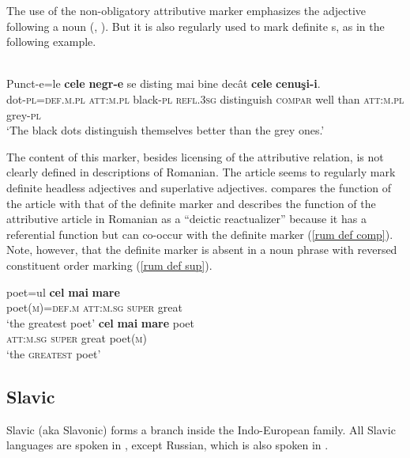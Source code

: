The use of the non-obligatory attributive marker emphasizes the adjective following a noun (\citealt[94]{beyer-etal1987}, \citealt[148]{posner1996}). But it is also regularly used to mark definite s, as in the following example.
\begin{exe}
\\
\gll Punct-e=le \textbf{cele} \textbf{negr-e} se disting mai bine decât \textbf{cele} \textbf{cenuşi-i}.\\
dot-\textsc{pl}=\textsc{def.m.pl} \textsc{att:m.pl} black-\textsc{pl} \textsc{refl.3sg} distinguish \textsc{compar} well than \textsc{att:m.pl} grey-\textsc{pl}\\
\glt ‘The black dots distinguish themselves better than the grey ones.’
\end{exe}
The content of this marker, besides licensing of the attributive relation, is not clearly defined in descriptions of Romanian. The article seems to regularly mark definite headless adjectives and superlative adjectives. \citet[141]{kramsky1972} compares the function of the article with that of the definite marker and describes the function of the attributive article in Romanian as a “deictic reactualizer” because it has a referential function but can co-occur with the definite marker (\ref{rum def comp}). Note, however, that the definite marker is absent in a noun phrase with reversed constituent order marking  (\ref{rum def sup}).
\begin{exe}
\begin{xlist}
\ex
\label{rum def comp}
\gll	poet=ul \textbf{cel} \textbf{mai} \textbf{mare}\\
	poet(\textsc{m})=\textsc{def.m} \textsc{att:m.sg} \textsc{super} great\\
\glt	‘the greatest poet’
\ex
\label{rum def sup}
\gll	\textbf{cel} \textbf{mai} \textbf{mare} poet\\
	\textsc{att:m.sg} \textsc{super} great poet(\textsc{m})\\
\glt	‘the \textsc{greatest} poet’
\end{xlist}
\end{exe}

\subsection{Slavic}
\label{slavic synchr}
Slavic (aka Slavonic) forms a branch inside the Indo-European family. All Slavic languages are spoken in , except Russian, which is also spoken in .

